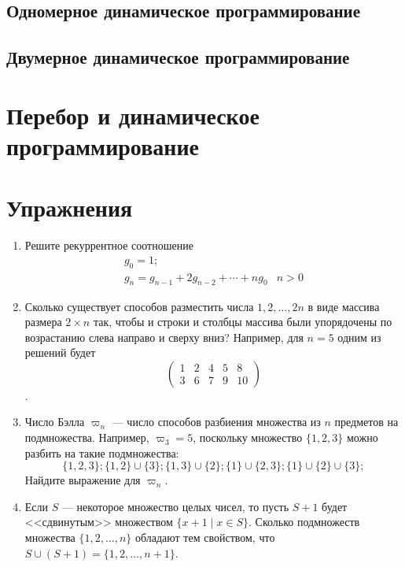 \documentclass[14pt,openany]{book}
\begin{document}
\section{Одномерное динамическое программирование}

\section{Двумерное динамическое программирование}

\chapter{Перебор и динамическое программирование}

\chapter{Упражнения}
\begin{enumerate}

\item Решите рекуррентное соотношение
$$
\begin{array}{ll}
g_0 = 1; \\
g_n = g_{n-1} + 2g_{n-2} + \cdots + ng_0 & n>0
\end{array}
$$

\item Сколько существует способов разместить числа ${1, 2, \ldots , 2n}$ 
в виде массива размера $2 \times n$ так, чтобы и строки и столбцы массива
были упорядочены по возрастанию слева направо и сверху вниз?
Например, для $n=5$ одним из решений будет 
$$\begin{pmatrix}
1 & 2 & 4 & 5 & 8 \\
3 & 6 & 7 & 9 & 10 
\end{pmatrix}$$.

\item Число Бэлла $\varpi_n$ --- число способов разбиения множества из $n$ предметов на подмножества.
      Например, $\varpi_3=5$, поскольку множество $\{1,2,3\}$ можно разбить на такие подмножества:
      $$\{1,2,3\}; \{1,2\}\cup\{3\}; \{1,3\}\cup\{2\}; \{1\}\cup\{2,3\}; \{1\}\cup\{2\}\cup\{3\}; $$
      Найдите выражение для $\varpi_n$.

\item Если $S$ --- некоторое множество целых чисел, то пусть $S+1$ будет <<сдвинутым>>
множеством $\{x+1 \mid x \in S\}$. Сколько подмножеств множества $\{1,2,\ldots,n\}$ обладают
тем свойством, что $S\cup(S+1) = \{1,2,\ldots,n+1\}$.

\end{enumerate}
\end{document}
